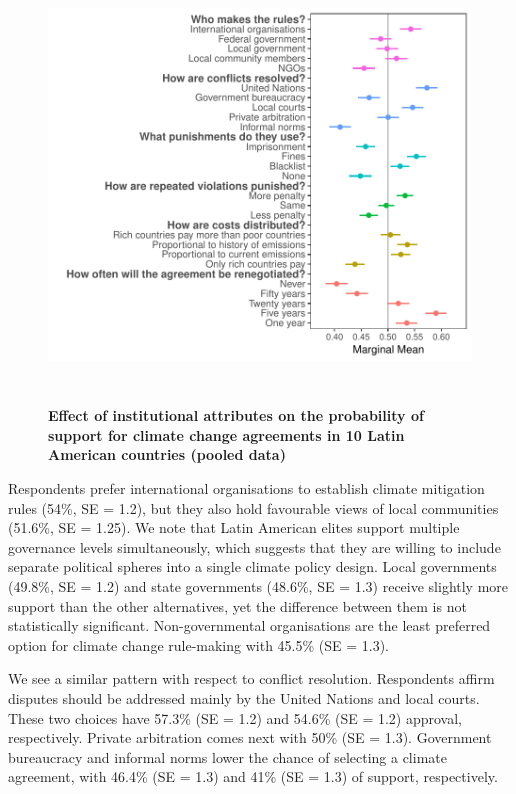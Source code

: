 \documentclass[a4paper,12pt]{article}
\begin{document}
\begin{figure}[H]
	\centering
	\includegraphics[width=.9\linewidth,height=11.5cm]{pooled.pdf}
	\caption{\textbf{Effect of institutional attributes on the probability of support for climate change agreements in 10 Latin American countries (pooled data)}}
	\label{fig:pooled}
\end{figure}

Respondents prefer international organisations to establish climate mitigation rules (54\%, SE = 1.2), but they also hold favourable views of local communities (51.6\%, SE = 1.25). We note that Latin American elites support multiple governance levels simultaneously, which suggests that they are willing to include separate political spheres into a single climate policy design.  Local governments (49.8\%, SE = 1.2) and state governments (48.6\%, SE = 1.3) receive slightly more support than the other alternatives, yet the difference between them is not statistically significant. Non-governmental organisations are the least preferred option for climate change rule-making with 45.5\% (SE = 1.3). 

We see a similar pattern with respect to conflict resolution. Respondents affirm disputes should be addressed mainly by the United Nations and local courts. These two choices have 57.3\% (SE = 1.2) and 54.6\% (SE = 1.2) approval, respectively. Private arbitration comes next with 50\% (SE = 1.3). Government bureaucracy and informal norms lower the chance of selecting a climate agreement, with 46.4\% (SE = 1.3) and 41\% (SE = 1.3) of support, respectively. 
\end{document}
